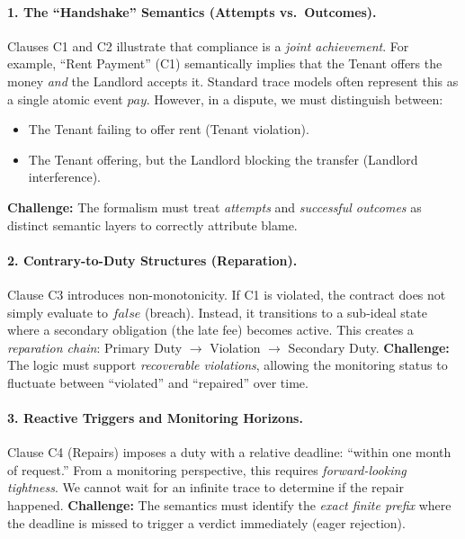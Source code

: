 \documentclass{article}
\begin{document}
    \paragraph{1. The ``Handshake'' Semantics (Attempts vs.\ Outcomes).}
    Clauses C1 and C2 illustrate that compliance is a \emph{joint achievement}.
    For example, ``Rent Payment'' (C1) semantically implies that the Tenant offers the money \emph{and} the Landlord accepts it.
    Standard trace models often represent this as a single atomic event $pay$.
    However, in a dispute, we must distinguish between:
    \begin{itemize}
        \item The Tenant failing to offer rent (Tenant violation).
        \item The Tenant offering, but the Landlord blocking the transfer (Landlord interference).
    \end{itemize}
    \textbf{Challenge:} The formalism must treat \emph{attempts} and \emph{successful outcomes} as distinct semantic layers to correctly attribute blame.
    
    \paragraph{2. Contrary-to-Duty Structures (Reparation).}
    Clause C3 introduces non-monotonicity. If C1 is violated, the contract does not simply evaluate to $\mathit{false}$ (breach). Instead, it transitions to a sub-ideal state where a secondary obligation (the late fee) becomes active.
    This creates a \emph{reparation chain}: Primary Duty $\rightarrow$ Violation $\rightarrow$ Secondary Duty.
    \textbf{Challenge:} The logic must support \emph{recoverable violations}, allowing the monitoring status to fluctuate between ``violated'' and ``repaired'' over time.
    
    \paragraph{3. Reactive Triggers and Monitoring Horizons.}
    Clause C4 (Repairs) imposes a duty with a relative deadline: ``within one month of request.''
    From a monitoring perspective, this requires \emph{forward-looking tightness}.
    We cannot wait for an infinite trace to determine if the repair happened.
    \textbf{Challenge:} The semantics must identify the \emph{exact finite prefix} where the deadline is missed to trigger a verdict immediately (eager rejection).
    
\end{document}
